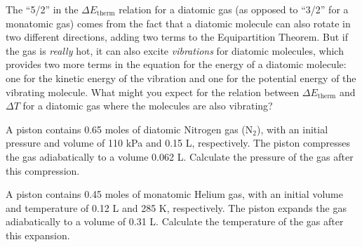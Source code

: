 \begin{problem}
The ``5/2'' in the $\Delta E_\text{therm}$ relation for a diatomic gas (as
opposed to ``3/2'' for a monatomic gas) comes from the fact that
a diatomic molecule can also rotate in two different directions, 
adding two terms to the Equipartition Theorem. But if the gas is
{\em really} hot, it can also excite {\em vibrations} for diatomic
molecules, which provides two more terms in the equation for the energy
of a diatomic molecule: one for the kinetic energy of the vibration and
one for the potential energy of the vibrating molecule. What might you
expect for the relation between $\Delta E_\text{therm}$ and $\Delta T$
for a diatomic gas where the molecules are also vibrating?
\end{problem}

\begin{problem}
A piston contains 0.65 moles of diatomic Nitrogen gas (N$_2$),
with an initial pressure and volume of 110 kPa and 0.15 L, respectively.
The piston compresses the gas adiabatically to a volume 0.062 L.
Calculate the pressure of the gas after this compression.
\end{problem}

\begin{problem}
A piston contains 0.45 moles of monatomic Helium gas, with an initial
volume and temperature of 0.12 L and 285 K, respectively. The
piston expands the gas adiabatically to a volume of 0.31 L.
Calculate the temperature of the gas after this expansion.
\end{problem}

